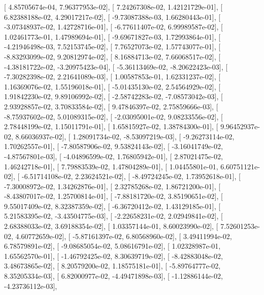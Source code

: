 \documentclass{article}
\begin{document}
       [  4.85705674e-04,   7.96377953e-02],
       [  7.24267308e-02,   1.42121729e-01],
       [  6.82388188e-02,   4.29017217e-02],
       [ -9.73087388e-03,   1.66280443e-01],
       [ -3.07348937e-02,   1.42728716e-01],
       [ -6.77611407e-02,   6.99989587e-02],
       [  1.02461773e-01,   1.47989694e-01],
       [ -9.69671827e-03,   1.72993864e-01],
       [ -4.21946498e-03,   7.52153745e-02],
       [  7.76527073e-02,   1.57743077e-01],
       [ -8.83293099e-02,   9.20812974e-02],
       [  8.16884713e-02,   7.66068517e-02],
       [ -4.38181722e-02,  -3.20975423e-04],
       [ -5.36113469e-02,  -8.20622423e-03],
       [ -7.30282398e-02,   2.21641089e-03],
       [  1.00587853e-01,   1.62331237e-02],
       [  1.16369076e-02,   1.55196018e-01],
       [ -5.01435130e-02,   2.54564929e-02],
       [  1.91842230e-02,   9.89106992e-02],
       [ -2.58742283e-02,  -7.08573042e-03],
       [  2.93928857e-02,   3.70833584e-02],
       [  9.47846397e-02,   2.75859666e-03],
       [ -8.75937602e-02,   5.01089315e-02],
       [ -2.03095001e-02,   9.08233556e-02],
       [  2.78448199e-02,   1.15011791e-01],
       [  1.65815927e-02,   1.38784300e-01],
       [  9.96452937e-02,   8.66036937e-02],
       [  1.28091734e-02,  -8.53097219e-03],
       [ -9.26273114e-02,   1.70262557e-01],
       [ -7.80587906e-02,   9.53824143e-02],
       [ -3.16041749e-02,  -4.87567801e-03],
       [ -4.04896599e-02,   1.76805942e-01],
       [  2.87021475e-02,   1.46242718e-01],
       [  7.79883539e-02,   1.47804289e-01],
       [  1.04455801e-01,   6.60751121e-02],
       [ -6.51714108e-02,   2.23624521e-02],
       [ -8.49724245e-02,   1.73952618e-01],
       [ -7.30008972e-02,   1.34262876e-01],
       [  2.32785268e-02,   1.86721200e-01],
       [ -8.43807017e-02,   1.25700814e-01],
       [ -7.88181720e-02,   3.85190651e-02],
       [  9.55017409e-02,   8.32387359e-02],
       [ -6.36720412e-02,   1.43129185e-01],
       [  5.21583395e-02,  -3.43504775e-03],
       [ -2.22658231e-02,   2.02949841e-02],
       [  2.68388033e-02,   3.69188354e-02],
       [  1.03357144e-01,   8.60023990e-02],
       [  7.52601253e-02,   4.60772659e-02],
       [ -5.87161397e-02,   6.80568960e-02],
       [  3.49411994e-02,   6.78579891e-02],
       [ -9.08685054e-02,   5.08616791e-02],
       [  1.02328987e-01,   1.65562570e-01],
       [ -1.46792425e-02,   8.30639719e-02],
       [ -8.42883048e-02,   3.48673865e-02],
       [  8.20579200e-02,   1.18575181e-01],
       [ -5.89764777e-02,   8.35205334e-03],
       [  6.82000977e-02,  -4.49471898e-03],
       [ -1.12886144e-02,  -4.23736112e-03],
\end{document}
